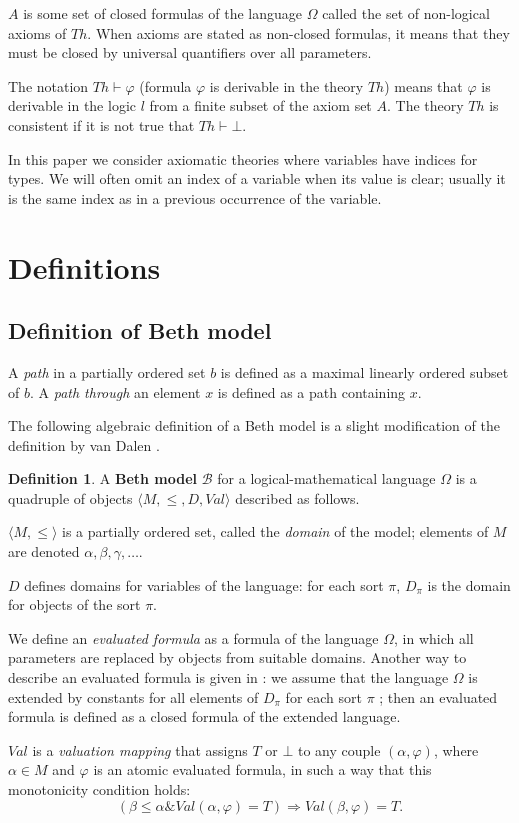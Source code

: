 \documentclass{asl}
\theoremstyle{definition}
\newtheorem{definition}{Definition}[section]
\begin{document}
$ A $ is some set of closed formulas of the language $ \Omega $ called the set of non-logical axioms of $ Th $. When axioms are stated as non-closed formulas, it means that they must be closed by universal quantifiers over all parameters. 

The notation $ Th \vdash \varphi $ (formula $ \varphi $ is derivable in the theory $Th$) means that $ \varphi $ is derivable in the logic $ l $ from a finite subset of the axiom set $ A $. The theory $ Th $ is consistent if it is not true that 
$ Th \vdash \bot $.

In this paper we consider axiomatic theories where variables have indices for types. We will often omit an index of a variable when its value is clear; usually it is the same index as in a previous occurrence of the variable.

\section{Definitions}

\subsection{Definition of Beth model}
A \textit{path} in a partially ordered set $b$ is defined as a maximal linearly ordered subset of $b$. A \textit{path through} an element $x$ is defined as a path containing $x$. 

The following algebraic definition of a Beth model is a slight modification of the definition by van Dalen \cite{vand78}.

\begin{definition}
A \textbf{Beth model} $ \mathcal{B} $ for a logical-mathematical language $ \Omega $ is a quadruple of objects $\langle M, \leqslant, D, Val \rangle$ described as follows.

$\langle M, \leqslant \rangle$ is a partially ordered set, called the \textit{domain} of the model; elements of $M$ are denoted $\alpha, \beta, \gamma,\ldots$.
\smallskip

$D$ defines domains for variables of the language: for each sort $ \pi $, $ D_\pi $ is the domain for objects of the sort $ \pi $.

We define an \textit{evaluated formula} as a formula of the language $ \Omega $, in which all parameters are replaced by objects from suitable domains. Another way to describe an evaluated formula is given in \cite{vand78}: we assume that the language $ \Omega $ is extended by constants for all elements of $ D_\pi $ for each sort $ \pi $ ; then an evaluated formula is defined as a closed formula of the extended language.

$Val$ is a \textit{valuation mapping} that assigns $ T $ or $\bot$ to any couple $ (\alpha,\varphi) $, where \\$\alpha\in M$ and $ \varphi $ is an atomic evaluated formula, in such a way that this monotonicity condition holds:
\[(\beta\leqslant\alpha \& Val(\alpha,\varphi)=T)\Rightarrow Val(\beta,\varphi)=T.\]

\end{definition}
\end{document}
